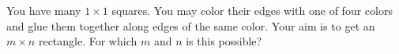 You have many $1 \times 1$ squares. You may color their edges with one of four colors and glue them together along edges of the same color. Your aim is to get an $m \times n$ rectangle. For which $m$ and $n$ is this possible?
